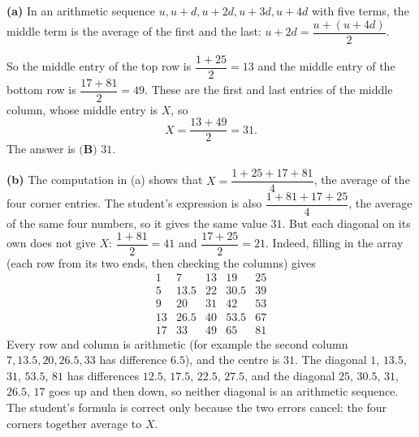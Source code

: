 \textbf{(a)} In an arithmetic sequence $u,u+d,u+2d,u+3d,u+4d$ with five terms, the middle term is the average of the first and the last: $u+2d=\dfrac{u+(u+4d)}{2}$.

So the middle entry of the top row is $\dfrac{1+25}{2}=13$ and the middle entry of the bottom row is $\dfrac{17+81}{2}=49$. These are the first and last entries of the middle column, whose middle entry is $X$, so
\[X=\dfrac{13+49}{2}=31.\]
The answer is $\boxed{\textbf{(B) }31}$.

\textbf{(b)} The computation in (a) shows that $X=\dfrac{1+25+17+81}{4}$, the average of the four corner entries. The student's expression is also $\dfrac{1+81+17+25}{4}$, the average of the same four numbers, so it gives the same value $31$. But each diagonal on its own does not give $X$: $\dfrac{1+81}{2}=41$ and $\dfrac{17+25}{2}=21$. Indeed, filling in the array (each row from its two ends, then checking the columns) gives
\[\begin{array}{ccccc}
1&7&13&19&25\\
5&13.5&22&30.5&39\\
9&20&31&42&53\\
13&26.5&40&53.5&67\\
17&33&49&65&81
\end{array}\]
Every row and column is arithmetic (for example the second column $7,13.5,20,26.5,33$ has difference $6.5$), and the centre is $31$. The diagonal $1$, $13.5$, $31$, $53.5$, $81$ has differences $12.5$, $17.5$, $22.5$, $27.5$, and the diagonal $25$, $30.5$, $31$, $26.5$, $17$ goes up and then down, so neither diagonal is an arithmetic sequence. The student's formula is correct only because the two errors cancel: the four corners together average to $X$.
